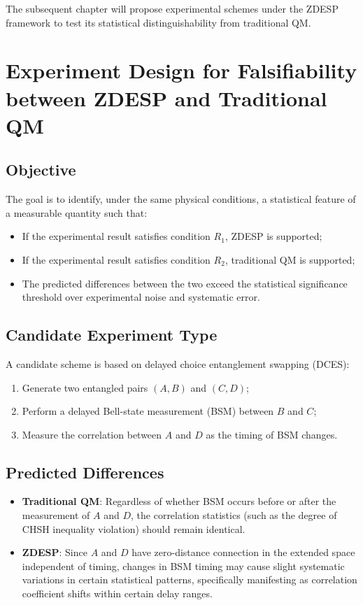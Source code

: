 \documentclass[12pt,a4paper]{article}
\begin{document}
	The subsequent chapter will propose experimental schemes under the ZDESP framework to test its statistical distinguishability from traditional QM.
	
	\section{Experiment Design for Falsifiability between ZDESP and Traditional QM}
	
	\subsection{Objective}
	The goal is to identify, under the same physical conditions, a statistical feature of a measurable quantity such that:
	\begin{itemize}
		\item If the experimental result satisfies condition $R_1$, ZDESP is supported;
		\item If the experimental result satisfies condition $R_2$, traditional QM is supported;
		\item The predicted differences between the two exceed the statistical significance threshold over experimental noise and systematic error.
	\end{itemize}
	
	\subsection{Candidate Experiment Type}
	A candidate scheme is based on delayed choice entanglement swapping (DCES):
	\begin{enumerate}
		\item Generate two entangled pairs $(A,B)$ and $(C,D)$;
		\item Perform a delayed Bell-state measurement (BSM) between $B$ and $C$;
		\item Measure the correlation between $A$ and $D$ as the timing of BSM changes.
	\end{enumerate}
	
	\subsection{Predicted Differences}
	\begin{itemize}
		\item \textbf{Traditional QM}: Regardless of whether BSM occurs before or after the measurement of $A$ and $D$, the correlation statistics (such as the degree of CHSH inequality violation) should remain identical.
		\item \textbf{ZDESP}: Since $A$ and $D$ have zero-distance connection in the extended space independent of timing, changes in BSM timing may cause slight systematic variations in certain statistical patterns, specifically manifesting as correlation coefficient shifts within certain delay ranges.
	\end{itemize}
	
\end{document}
